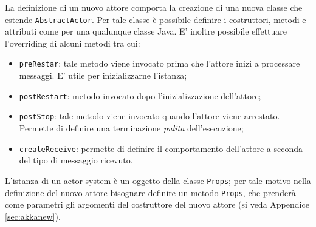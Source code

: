 La definizione di un nuovo attore comporta la creazione di una nuova classe
che estende \texttt{AbstractActor}.
Per tale classe è possibile definire i costruttori, metodi e attributi come per una
qualunque classe Java. E' inoltre possibile  effettuare l'overriding di alcuni metodi 
tra cui:
\begin{itemize}
	\item \texttt{preRestar}: tale metodo viene invocato prima che l'attore inizi
	a processare messaggi. E' utile per inizializzarne l'istanza;
	\item \texttt{postRestart}: metodo invocato dopo l'inizializzazione dell'attore;
	\item \texttt{postStop}: tale metodo viene invocato quando l'attore viene arrestato.
	Permette di definire una terminazione \emph{pulita} dell'esecuzione;
	\item \texttt{createReceive}: permette di definire il comportamento dell'attore
	a seconda del tipo di messaggio ricevuto.
\end{itemize}
L'istanza di un actor system è un oggetto della classe \texttt{Props}; per tale motivo
nella definizione del nuovo attore bisognare definire un metodo \texttt{Props}, che prenderà
come parametri gli argomenti del costruttore del nuovo attore (si veda Appendice \ref{sec:akkanew}).
